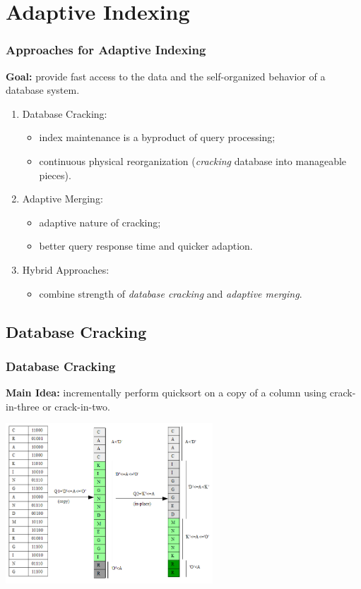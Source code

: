 \documentclass{beamer}
\begin{document}
\section{Adaptive Indexing}
\begin{frame}
\frametitle{Approaches for Adaptive Indexing}
\textbf{Goal:} provide fast access to the data and the self-organized behavior of a database system. \pause
\begin{enumerate}
\item{Database Cracking:}
\begin{itemize}
\item{index maintenance is a byproduct of query processing;}
\item{continuous physical reorganization (\textit{cracking} database into manageable pieces).}
\end{itemize}
\pause
\item{Adaptive Merging:}
\begin{itemize}
\item{adaptive nature of cracking;}
\item{better query response time and quicker adaption.}
\end{itemize}
\pause
\item{Hybrid Approaches:}
\begin{itemize}
\item{combine strength of \emph{database cracking} and \emph{adaptive merging}.}
\end{itemize}
\end{enumerate}
\end{frame}

\subsection{Database Cracking}
\begin{frame}
\frametitle{Database Cracking}
\textbf{Main Idea: } incrementally perform quicksort on a copy of a column using crack-in-three or crack-in-two. \pause
\begin{center}
\includegraphics[width=\linewidth, height=6cm, keepaspectratio]{graphics/cracking.png}
\end{center}
\end{frame}
\end{document}
